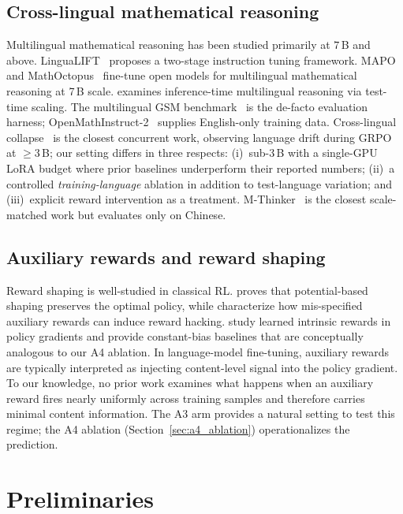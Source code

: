 \documentclass[11pt]{article}
\newcommand{\armC}{\textsc{A3}}
\newcommand{\armD}{\textsc{A4}}
\begin{document}
\subsection{Cross-lingual mathematical reasoning}
Multilingual mathematical reasoning has been studied primarily at
$7$\,B and above. LinguaLIFT~\cite{lingualift_2024} proposes a two-stage
instruction tuning framework. MAPO~\cite{mapo_2024} and
MathOctopus~\cite{mathoctopus_2024} fine-tune open models for
multilingual mathematical reasoning at 7\,B scale.
\citet{xreasoning_test_time_2025} examines inference-time multilingual
reasoning via test-time scaling. The multilingual GSM
benchmark~\cite{mgsm_2022} is the de-facto evaluation harness;
OpenMathInstruct-2~\cite{openmathinstruct2_2024} supplies English-only
training data. Cross-lingual collapse~\cite{xlingual_collapse_2025} is
the closest concurrent work, observing language drift during GRPO at
$\geq 3$\,B; our setting differs in three respects: (i)~sub-3\,B with a
single-GPU LoRA budget where prior baselines underperform their reported
numbers; (ii)~a controlled \emph{training-language} ablation in addition
to test-language variation; and (iii)~explicit reward intervention as a
treatment. M-Thinker~\cite{mthinker_2025} is the closest scale-matched
work but evaluates only on Chinese.

\subsection{Auxiliary rewards and reward shaping}
Reward shaping is well-studied in classical RL.
\citet{ng1999policy} proves that potential-based shaping preserves the
optimal policy, while \citet{skalse2022rewardhacking} characterize how
mis-specified auxiliary rewards can induce reward hacking.
\citet{zheng_intrinsic_2018} study learned intrinsic rewards in policy
gradients and provide constant-bias baselines that are conceptually
analogous to our \armD{} ablation. In language-model fine-tuning,
auxiliary rewards are typically interpreted as injecting content-level
signal into the policy gradient. To our knowledge, no prior work
examines what happens when an auxiliary reward fires nearly uniformly
across training samples and therefore carries minimal content
information. The \armC{} arm provides a natural setting to test this
regime; the \armD{} ablation (Section~\ref{sec:a4_ablation})
operationalizes the prediction.

\section{Preliminaries}
\label{sec:preliminaries}
\end{document}
